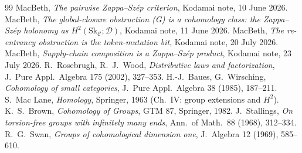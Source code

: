 \documentclass[11pt]{article}
\theoremstyle{definition}
\newcommand{\C}{\mathcal{C}}
\newcommand{\D}{\mathcal{D}}
\newcommand{\Sk}{\mathrm{Sk}}
\begin{document}
\begin{thebibliography}{99}
 MacBeth, \emph{The pairwise Zappa--Sz\'ep criterion}, Kodamai
note, 10 June 2026.
 MacBeth, \emph{The global-closure obstruction (G) is a cohomology
class: the Zappa--Sz\'ep holonomy as $H^2(\Sk_\C;\D)$}, Kodamai note, 11 June 2026.
 MacBeth, \emph{The re-entrancy obstruction is the token-mutation bit},
Kodamai note, 20 July 2026.
 MacBeth, \emph{Supply-chain composition is a Zappa--Sz\'ep product},
Kodamai note, 23 July 2026.
 R.~Rosebrugh, R.~J.~Wood, \emph{Distributive laws and factorization},
J.\ Pure Appl.\ Algebra 175 (2002), 327--353.
 H.-J.~Baues, G.~Wirsching, \emph{Cohomology of small categories},
J.\ Pure Appl.\ Algebra 38 (1985), 187--211.
 S.~Mac Lane, \emph{Homology}, Springer, 1963 (Ch.~IV: group
extensions and $H^2$).
 K.~S.~Brown, \emph{Cohomology of Groups}, GTM 87, Springer, 1982.
 J.~Stallings, \emph{On torsion-free groups with infinitely many
ends}, Ann.\ of Math.\ 88 (1968), 312--334.
 R.~G.~Swan, \emph{Groups of cohomological dimension one},
J.\ Algebra 12 (1969), 585--610.
\end{thebibliography}
\end{document}
